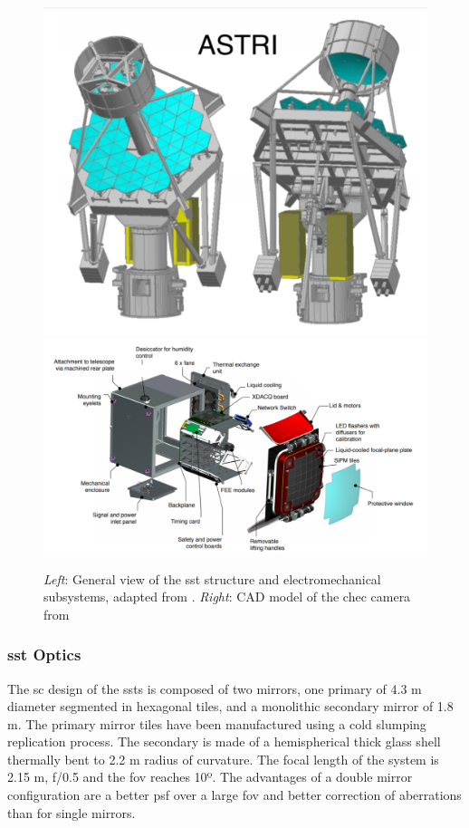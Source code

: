 \documentclass[main.tex]{subfiles}
\begin{document}
\begin{figure}[!htb]
  \includegraphics[width=\linewidth]{Pictures/ASTRI.pdf}
  \endminipage\hfill
  \includegraphics[width=\linewidth]{Pictures/CHECcam.pdf}
  \endminipage\hfill
  \caption{\label{fig:SST} \textit{Left}: General view of the \gls{sst} structure and electromechanical subsystems, adapted from \cite{2013SSTstruct}. \textit{Right}: CAD model of the \gls{chec} camera from \cite{2017CHECcam} }
\end{figure}

\subsubsection{\gls{sst} Optics}

The \gls{sc} design of the \glspl{sst} is composed of two mirrors, one primary of 4.3 m diameter segmented in hexagonal tiles, and a monolithic secondary mirror of 1.8 m. The primary mirror tiles have been manufactured using a cold slumping replication process. The secondary is made of a hemispherical thick glass shell thermally bent to 2.2 m radius of curvature. The focal length of the system is 2.15 m, f/0.5 and the \gls{fov} reaches 10º.
The advantages of a double mirror configuration are a better \gls{psf} over a large \gls{fov} and better correction of aberrations \cite{2017ASTRItels} than for single mirrors.
\end{document}
